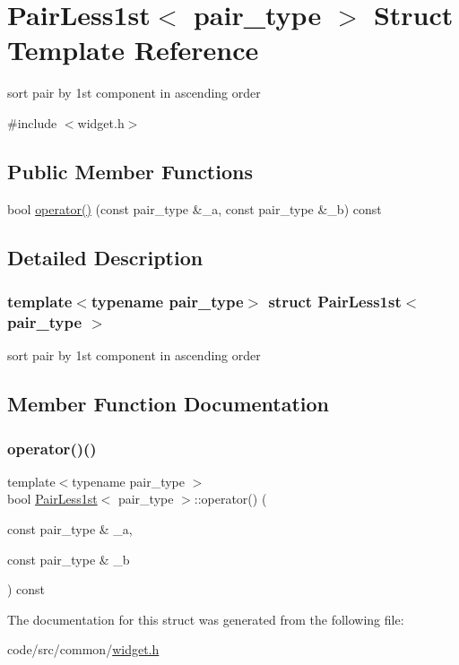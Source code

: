 \hypertarget{struct_pair_less1st}{}\section{Pair\+Less1st$<$ pair\+\_\+type $>$ Struct Template Reference}
\label{struct_pair_less1st}


sort pair by 1st component in ascending order  




{\ttfamily \#include $<$widget.\+h$>$}

\subsection*{Public Member Functions}
\begin{DoxyCompactItemize}
\item 
bool \hyperlink{struct_pair_less1st_a0c8e1c7ad75317672327e20bdafe56e3}{operator()} (const pair\+\_\+type \&\+\_\+a, const pair\+\_\+type \&\+\_\+b) const
\end{DoxyCompactItemize}


\subsection{Detailed Description}
\subsubsection*{template$<$typename pair\+\_\+type$>$\newline
struct Pair\+Less1st$<$ pair\+\_\+type $>$}

sort pair by 1st component in ascending order 

\subsection{Member Function Documentation}
\mbox{\label{struct_pair_less1st_a0c8e1c7ad75317672327e20bdafe56e3}} 
\subsubsection{\texorpdfstring{operator()()}{operator()()}}
{\footnotesize\ttfamily template$<$typename pair\+\_\+type $>$ \\
bool \hyperlink{struct_pair_less1st}{Pair\+Less1st}$<$ pair\+\_\+type $>$\+::operator() (\begin{DoxyParamCaption}\item[{const pair\+\_\+type \&}]{\+\_\+a,  }\item[{const pair\+\_\+type \&}]{\+\_\+b }\end{DoxyParamCaption}) const\hspace{0.3cm}{\ttfamily [inline]}}



The documentation for this struct was generated from the following file\+:\begin{DoxyCompactItemize}
\item 
code/src/common/\hyperlink{widget_8h}{widget.\+h}\end{DoxyCompactItemize}
